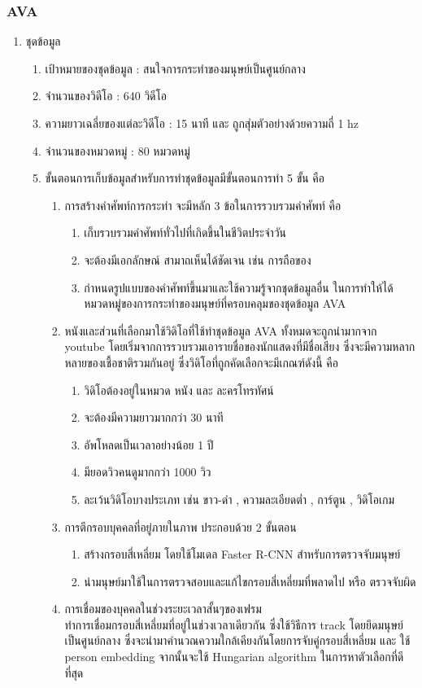 \subsubsection*{AVA}	
\begin{enumerate}
	\item {ชุดข้อมูล}
	\begin{enumerate}
		\item เป้าหมายของชุดข้อมูล : สนใจการกระทำของมนุษย์เป็นศูนย์กลาง
		\item จำนวนของวิดีโอ : 640 วิดีโอ
		\item ความยาวเฉลี่ยของแต่ละวิดีโอ : 15 นาที และ ถูกสุ่มตัวอย่างด้วยความถี่ 1 hz 
		\item จำนวนของหมวดหมู่ : 80 หมวดหมู่
		\item ขั้นตอนการเก็บข้อมูลสำหรับการทำชุดข้อมูลมีขั้นตอนการทำ 5 ขั้น คือ
	\begin{enumerate}
%
		\item การสร้างคำศัพท์การกระทำ จะมีหลัก 3 ข้อในการรวบรวมคำศัพท์ คือ
		\begin{enumerate}
			\item เก็บรวบรวมคำศัพท์ทั่วไปที่เกิดขึ้นในชีวิตประจำวัน
			\item จะต้องมีเอกลักษณ์ สามาถเห็นได้ชัดเจน เช่น การถือของ
			\item กำหนดรูปแบบของคำศัพท์ขึ้นมาและใช้ความรู้จากชุดข้อมูลอื่น ในการทำให้ได้หมวดหมู่ของการกระทำของมนุษย์ที่ครอบคลุมของชุดข้อมูล AVA
		\end{enumerate}

%
		\item  หนังและส่วนที่เลือกมาใช้วิดิโอที่ใช้ทำชุดข้อมูล AVA ทั้งหมดจะถูกนำมากจาก youtube โดยเริ่มจากการรวบรวมเอารายชื่อของนักแสดงที่มีชื่อเสียง ซึ่งจะมีความหลากหลายของเชื้อชาติรวมกันอยู่ ซึ่งวิดิโอที่ถูกคัดเลือกจะมีเกณฑ์ดังนี้ คือ
			\begin{enumerate}
				\item วิดิโอต้องอยู่ในหมวด หนัง และ ละครโทรทัศน์
				\item จะต้องมีความยาวมากกว่า 30 นาที
				\item อัพโหลดเป็นเวลาอย่างน้อย 1 ปี
				\item มียอดวิวคนดูมากกว่า 1000 วิว
				\item ละเว้นวิดิโอบางประเภท เช่น ขาว-ดำ , ความละเอียดต่ำ , การ์ตูน , วิดิโอเกม
			\end{enumerate}
%
		\item  การตีกรอบบุคคลที่อยู่ภายในภาพ ประกอบด้วย 2 ขั้นตอน
			\begin{enumerate}
				\item สร้างกรอบสี่เหลี่ยม โดยใช้โมเดล Faster R-CNN สำหรับการตรวจจับมนุษย์
				\item นำมนุษย์มาใช้ในการตรวจสอบและแก้ไขกรอบสี่เหลี่ยมที่พลาดไป หรือ ตรวจจับผิด
			\end{enumerate}	
		\item  การเชื่อมของบุคคลในช่วงระยะเวลาสั้นๆของเฟรม 
\\
ทำการเชื่อมกรอบสี่เหลี่ยมที่อยู่ในช่วงเวลาเดียวกัน ซึ่งใช้วิธีการ track โดยยึดมนุษย์เป็นศูนย์กลาง ซึ่งจะนำมาคำนวณความใกล้เคียงกันโดยการจับคู่กรอบสี่เหลี่ยม และ ใช้ person embedding จากนั้นจะใช้ Hungarian algorithm ในการหาตัวเลือกที่ดีที่สุด


\end{enumerate}
\end{enumerate}
\end{enumerate}
